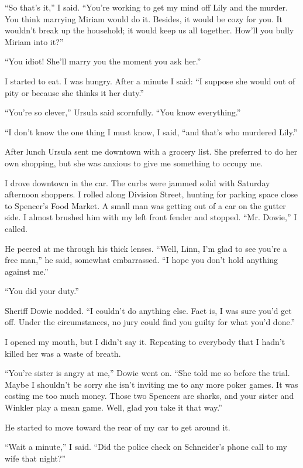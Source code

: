 \documentclass{novel}
\begin{document}
“So that’s it,” I said. “You’re working to get my mind off Lily and the murder. You think marrying Miriam would do it. Besides, it would be cozy for you. It wouldn’t break up the household; it would keep us all together. How’ll you bully Miriam into it?”

“You idiot! She’ll marry you the moment you ask her.”

I started to eat. I was hungry. After a minute I said: “I suppose she would out of pity or because she thinks it her duty.”

“You’re so clever,” Ursula said scornfully. “You know everything.”

“I don’t know the one thing I must know, I said, “and that’s who murdered Lily.”

\scenestars

After lunch Ursula sent me downtown with a grocery list. She preferred to do her own shopping, but she was anxious to give me something to occupy me.

I drove downtown in the car. The curbs were jammed solid with Saturday afternoon shoppers. I rolled along Division Street, hunting for parking space close to Spencer’s Food Market. A small man was getting out of a car on the gutter side. I almost brushed him with my left front fender and stopped. “Mr. Dowie,” I called.

He peered at me through his thick lenses. “Well, Linn, I’m glad to see you’re a free man,” he said, somewhat embarrassed. “I hope you don’t hold anything against me.”

“You did your duty.”

Sheriff Dowie nodded. “I couldn’t do anything else. Fact is, I was sure you’d get off. Under the circumstances, no jury could find you guilty for what you’d done.”

I opened my mouth, but I didn’t say it. Repeating to everybody that I hadn’t killed her was a waste of breath.

“You’re sister is angry at me,” Dowie went on. “She told me so before the trial. Maybe I shouldn’t be sorry she isn’t inviting me to any more poker games. It was costing me too much money. Those two Spencers are sharks, and your sister and Winkler play a mean game. Well, glad you take it that way.” 

He started to move toward the rear of my car to get around it.

“Wait a minute,” I said. “Did the police check on Schneider’s phone call to my wife that night?”
\end{document}
